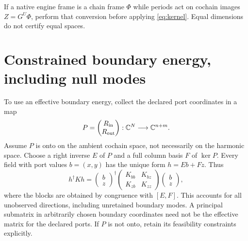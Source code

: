 \documentclass[11pt]{article}
\theoremstyle{definition}
\newcommand{\C}{\mathbb C}
\newcommand{\R}{\mathbb R}
\begin{document}
If a native engine frame is a chain frame $\Phi$ while periods act on
cochain images $Z=G^U\Phi$, perform that conversion before applying
\eqref{eq:kernel}. Equal dimensions do not certify equal spaces.

\section{Constrained boundary energy, including null modes}\label{sec:schur}
To use an effective boundary energy, collect the declared port
coordinates in a map
\[
 P=\begin{pmatrix}R_{\rm in}\\R_{\rm out}\end{pmatrix}:
 \C^N\longrightarrow\C^{n+m}.
\]
Assume $P$ is onto on the ambient cochain space, not necessarily on the
harmonic space. Choose a right inverse $E$ of $P$ and a full column basis
$F$ of $\ker P$. Every field with port values $b=(x,y)$ has the unique form
$h=Eb+Fz$. Thus
\[
 h^\dagger Kh=
 \begin{pmatrix}b\\z\end{pmatrix}^{\!\dagger}
 \begin{pmatrix}K_{bb}&K_{bz}\\K_{zb}&K_{zz}\end{pmatrix}
 \begin{pmatrix}b\\z\end{pmatrix},
\]
where the blocks are obtained by congruence with $[E,F]$.
This accounts for all unobserved directions, including unretained
boundary modes. A principal submatrix in arbitrarily chosen boundary
coordinates need not be the effective matrix for the declared ports.
If $P$ is not onto, retain its feasibility constraints explicitly.
\end{document}
